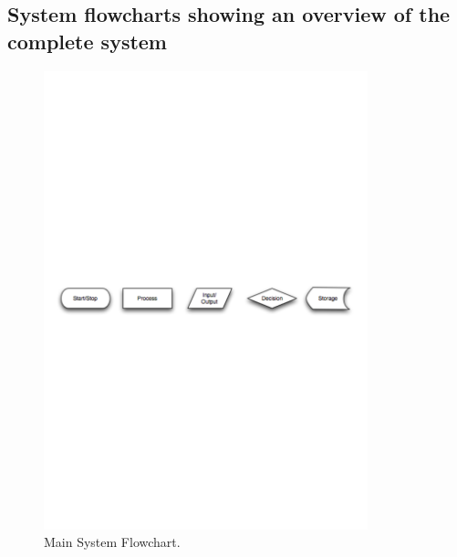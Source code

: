 \subsection{System flowcharts showing an overview of the complete system}

\begin{figure}[H]
    \begin{center}
        \includegraphics[width=355px]{./Design/system_flowcharts/PDFs/flowchart_key.pdf}
    \end{center}
    \caption{Main System Flowchart.} \label{fig:print_function_result}
\end{figure}

